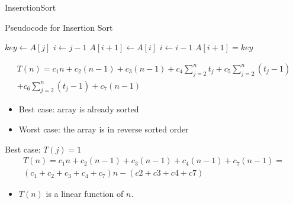 \begin{frame}{InserctionSort}

  \begin{block}{Pseudocode for Insertion Sort}
\begin{scriptsize}
    \begin{algorithmic}
                    
         \State $key \gets A[j]$                  
         \State $i \gets j-1$                     
                  
            \State $A[i+1] \gets A[i]$            
            \State $i \gets i - 1$                
         \EndWhile
         \State $A[i+1] = key$                    
       \EndFor
    \EndProcedure
    \end{algorithmic}
  \end{scriptsize}  
  \end{block}
\end{frame} 

\begin{frame}
  \begin{multline*}
    T(n)  =  c_1n + c_2(n-1) + c_3(n-1) + c_4\sum_{j=2}^{n}t_j + c_5\sum_{j=2}^{n}(t_j - 1) \\ + c_6\sum_{j=2}^{n}(t_j - 1) + c_7(n-1)
  \end{multline*}
\pause
  \begin{itemize}
   \item Best case: array is already sorted
   \item Worst case: the array is in reverse sorted order 
  \end{itemize}
  
\end{frame}

\begin{frame}{Best case: $T(j) = 1$}
  \begin{multline*}
    T(n)  =  c_1n + c_2(n-1) + c_3(n-1) + c_4(n-1) + c_7(n-1) = \\
             (c_1 + c_2 + c_3 + c_4 + c_7)n - (c2 + c3 + c4 + c7) 
  \end{multline*}

  \pause
  
  \begin{itemize}
    \item $T(n)$ is a linear function of $n$.
  \end{itemize}

\end{frame}

